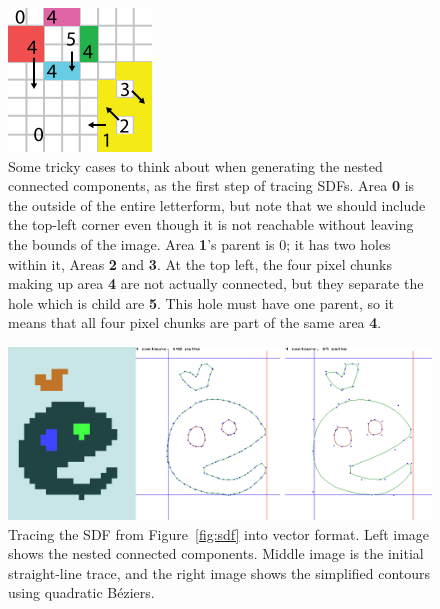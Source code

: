 \documentclass[twocolumn]{article}
\begin{document}
\begin{figure}[ht]
  \centering
\includegraphics[width=0.6 \linewidth]{connected}
\caption{
  Some tricky cases to think about when generating the nested
  connected components, as the first step of tracing SDFs. Area
  {\bf 0} is the outside of the entire letterform, but note that
  we should include the top-left corner even though it is not
  reachable without leaving the bounds of the image. Area {\bf 1}'s
  parent is 0; it has two holes within it, Areas {\bf 2} and {\bf 3}.
  At the top left, the four pixel chunks making up area {\bf 4} are
  not actually connected, but they separate the hole which is
  child are {\bf 5}. This hole must have one parent, so it means
  that all four pixel chunks are part of the same area {\bf 4}.
} \label{fig:connected}
\end{figure}

\begin{figure}[ht]
  \centering
\includegraphics[width=0.95 \linewidth]{trace}
\caption{ Tracing the SDF from Figure~\ref{fig:sdf} into vector
  format. Left image shows the nested connected components. Middle
  image is the initial straight-line trace, and the right image
  shows the simplified contours using quadratic B\'eziers.
} \label{fig:trace}
\end{figure}
\end{document}
